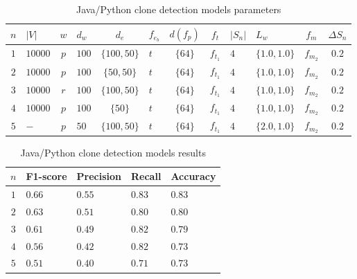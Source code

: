 \begin{table}
  \caption{\label{tab:java-python-model-params}Java/Python clone detection
    models parameters}
  \begin{center}
    \begin{tabularx}{\linewidth}{c Y c Y c Y c c Y Y c c}
      \toprule
      $n$ & $|V|$ & $w$ & $d_w$ & $d_e$ & $f_{e_b}$ & $d(f_p)$ & $f_t$ & $|S_n|$ & $L_w$ & $f_m$ & $\Delta S_n$\\
      \toprule
      $1$ & $10000$ & $p$ & $100$ & $\{100,50\}$ & $t$ & $\{64\}$ & $f_{t_1}$ & $4$ & $\{1.0,1.0\}$ & $f_{m_2}$ & $0.2$\\
      $2$ & $10000$ & $p$ & $100$ & $\{50,50\}$ & $t$ & $\{64\}$ & $f_{t_1}$ & $4$ & $\{1.0,1.0\}$ & $f_{m_2}$ & $0.2$\\
      $3$ & $10000$ & $r$ & $100$ & $\{100,50\}$ & $t$ & $\{64\}$ & $f_{t_1}$ & $4$ & $\{1.0,1.0\}$ & $f_{m_2}$ & $0.2$\\
      $4$ & $10000$ & $p$ & $100$ & $\{50\}$ & $t$ & $\{64\}$ & $f_{t_1}$ & $4$ & $\{1.0,1.0\}$ & $f_{m_2}$ & $0.2$\\
      $5$ & $-$ & $p$ & $50$ & $\{100,50\}$ & $t$ & $\{64\}$ & $f_{t_1}$ & $4$ & $\{2.0,1.0\}$ & $f_{m_2}$ & $0.2$\\
      \bottomrule
    \end{tabularx}
  \end{center}
\end{table}
%
\begin{table}
  \caption{\label{tab:java-python-model-results}Java/Python clone detection
    models results}
  \begin{center}
    \begin{tabularx}{\linewidth}{c Y Y Y Y}
      \toprule
      $n$ & F1-score & Precision & Recall & Accuracy\\
      \toprule
      $1$ & $0.66$ & $0.55$ & $0.83$ & $0.83$\\
      $2$ & $0.63$ & $0.51$ & $0.80$ & $0.80$\\
      $3$ & $0.61$ & $0.49$ & $0.82$ & $0.79$\\
      $4$ & $0.56$ & $0.42$ & $0.82$ & $0.73$\\
      $5$ & $0.51$ & $0.40$ & $0.71$ & $0.73$\\
      \bottomrule
    \end{tabularx}
  \end{center}
\end{table}
%
